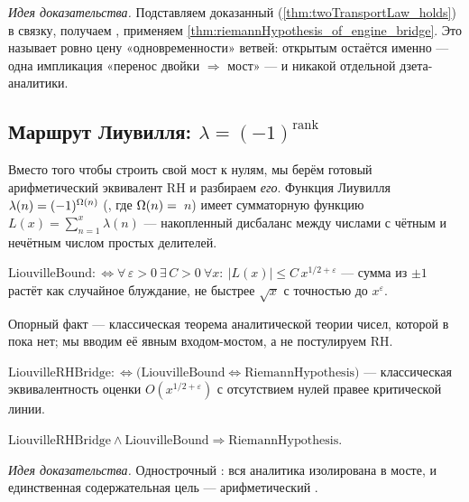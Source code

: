 \emph{Идея доказательства.} Подставляем доказанный 
(\cref{thm:twoTransportLaw_holds}) в связку, получаем , применяем
\cref{thm:riemannHypothesis_of_engine_bridge}. Это называет ровно цену «одновременности» ветвей:
открытым остаётся именно  --- одна импликация «перенос двойки $\Rightarrow$
мост» --- и никакой отдельной дзета-аналитики.

\subsection{Маршрут Лиувилля: $\lambda = (-1)^{\mathrm{rank}}$}

Вместо того чтобы строить свой мост к нулям, мы берём готовый арифметический эквивалент RH и
разбираем \emph{его}. Функция Лиувилля $\lambda(n) = (-1)^{\Omega(n)}$
(, где $\Omega(n) = $ \,$n$) имеет сумматорную
функцию $L(x) = \sum_{n=1}^{x}\lambda(n)$ --- накопленный дисбаланс между числами с чётным и нечётным
числом простых делителей.

\begin{definition}\label{def:LiouvilleBound}
$\mathrm{LiouvilleBound} :\Longleftrightarrow \forall\,\varepsilon>0\ \exists\,C>0\ \forall x:\ |L(x)| \le C\,x^{1/2+\varepsilon}$
--- сумма из $\pm1$ растёт как случайное блуждание, не быстрее $\sqrt{x}$ с точностью до $x^{\varepsilon}$.
\end{definition}

Опорный факт --- классическая теорема аналитической теории чисел, которой в  пока нет;
мы вводим её явным входом-мостом, а не постулируем RH.

\begin{definition}\label{def:LiouvilleRHBridge}
$\mathrm{LiouvilleRHBridge} :\Longleftrightarrow \bigl(\mathrm{LiouvilleBound} \iff \mathrm{RiemannHypothesis}\bigr)$
--- классическая эквивалентность оценки $O(x^{1/2+\varepsilon})$ с отсутствием нулей правее критической
линии. \red{}
\end{definition}

\begin{theorem}\label{thm:riemann_of_liouville_bound}
$\mathrm{LiouvilleRHBridge} \wedge \mathrm{LiouvilleBound} \Rightarrow \mathrm{RiemannHypothesis}$. \green{}
\end{theorem}

\emph{Идея доказательства.} Однострочный : вся аналитика изолирована в мосте,
и единственная содержательная цель --- арифметический .

